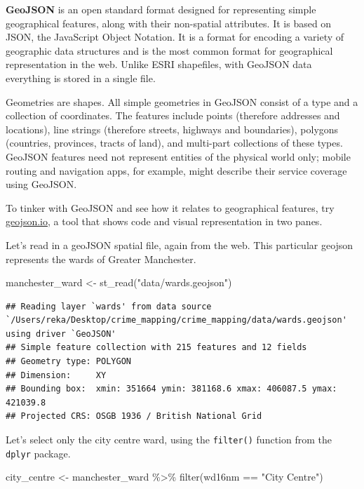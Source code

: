 \documentclass[
]{book}
\makeatletter
\newenvironment{Shaded}{\begin{snugshade}}{\end{snugshade}}
\newcommand{\FunctionTok}[1]{\textcolor[rgb]{0,0,0}{#1}}
\newcommand{\NormalTok}[1]{#1}
\newcommand{\OtherTok}[1]{\textcolor[rgb]{0.37,0.37,0.37}{#1}}
\newcommand{\SpecialCharTok}[1]{\textcolor[rgb]{0,0,0}{#1}}
\newcommand{\StringTok}[1]{\textcolor[rgb]{0.5,0.5,0.5}{#1}}
\newenvironment{kframe}{%
\medskip{}
\setlength{\fboxsep}{.8em}
 \def\at@end@of@kframe{}%
 \ifinner\ifhmode%
  \def\at@end@of@kframe{\end{minipage}}%
  \begin{minipage}{\columnwidth}%
 \fi\fi%
 \def\FrameCommand##1{\hskip\@totalleftmargin \hskip-\fboxsep
 \colorbox{shadecolor}{##1}\hskip-\fboxsep
     \hskip-\linewidth \hskip-\@totalleftmargin \hskip\columnwidth}%
 \MakeFramed {\advance\hsize-\width
   \@totalleftmargin\z@ \linewidth\hsize
   \@setminipage}}%
 {\par\unskip\endMakeFramed%
 \at@end@of@kframe}
\renewenvironment{Shaded}{\begin{kframe}}{\end{kframe}}
\makeatother
\begin{document}
\textbf{GeoJSON} is an open standard format designed for representing simple geographical features, along with their non-spatial attributes. It is based on JSON, the JavaScript Object Notation. It is a format for encoding a variety of geographic data structures and is the most common format for geographical representation in the web. Unlike ESRI shapefiles, with GeoJSON data everything is stored in a single file.

Geometries are shapes. All simple geometries in GeoJSON consist of a type and a collection of coordinates. The features include points (therefore addresses and locations), line strings (therefore streets, highways and boundaries), polygons (countries, provinces, tracts of land), and multi-part collections of these types. GeoJSON features need not represent entities of the physical world only; mobile routing and navigation apps, for example, might describe their service coverage using GeoJSON.

To tinker with GeoJSON and see how it relates to geographical features, try \url{geojson.io}, a tool that shows code and visual representation in two panes.

Let's read in a geoJSON spatial file, again from the web. This particular geojson represents the wards of Greater Manchester.

\begin{Shaded}
\begin{Highlighting}[]
\NormalTok{manchester\_ward }\OtherTok{\textless{}{-}} \FunctionTok{st\_read}\NormalTok{(}\StringTok{"data/wards.geojson"}\NormalTok{)}
\end{Highlighting}
\end{Shaded}

\begin{verbatim}
## Reading layer `wards' from data source `/Users/reka/Desktop/crime_mapping/crime_mapping/data/wards.geojson' using driver `GeoJSON'
## Simple feature collection with 215 features and 12 fields
## Geometry type: POLYGON
## Dimension:     XY
## Bounding box:  xmin: 351664 ymin: 381168.6 xmax: 406087.5 ymax: 421039.8
## Projected CRS: OSGB 1936 / British National Grid
\end{verbatim}

Let's select only the city centre ward, using the \texttt{filter()} function from the \texttt{dplyr} package.

\begin{Shaded}
\begin{Highlighting}[]
\NormalTok{city\_centre }\OtherTok{\textless{}{-}}\NormalTok{ manchester\_ward }\SpecialCharTok{\%\textgreater{}\%}
  \FunctionTok{filter}\NormalTok{(wd16nm }\SpecialCharTok{==} \StringTok{"City Centre"}\NormalTok{)}
\end{Highlighting}
\end{Shaded}
\end{document}
